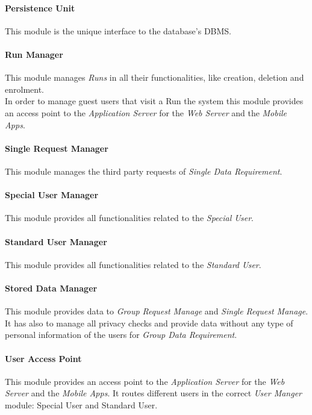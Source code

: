 \paragraph{Persistence Unit}
This module is the unique interface to the database's DBMS.

\paragraph{Run Manager}
This module manages \textit{Runs} in all their functionalities, like creation, deletion and enrolment.\\
In order to manage guest users that visit a Run the system this module provides an access point to the \textit{Application Server} for the \textit{Web Server} and the \textit{Mobile Apps}.

\paragraph{Single Request Manager}
This module manages the third party requests of \textit{Single Data Requirement}.

\paragraph{Special User Manager}
This module provides all functionalities related to the \textit{Special User}.

\paragraph{Standard User Manager}
This module provides all functionalities related to the \textit{Standard User}.

\paragraph{Stored Data Manager}
This module provides data to \textit{Group Request Manage} and \textit{Single Request Manage}. It has also to manage all privacy checks and provide data without any type of personal information of the users for \textit{Group Data Requirement}.

\paragraph{User Access Point}
This module provides an access point to the \textit{Application Server} for the \textit{Web Server} and the \textit{Mobile Apps}.
It routes different users in the correct \textit{User Manger} module: Special User and Standard User.



